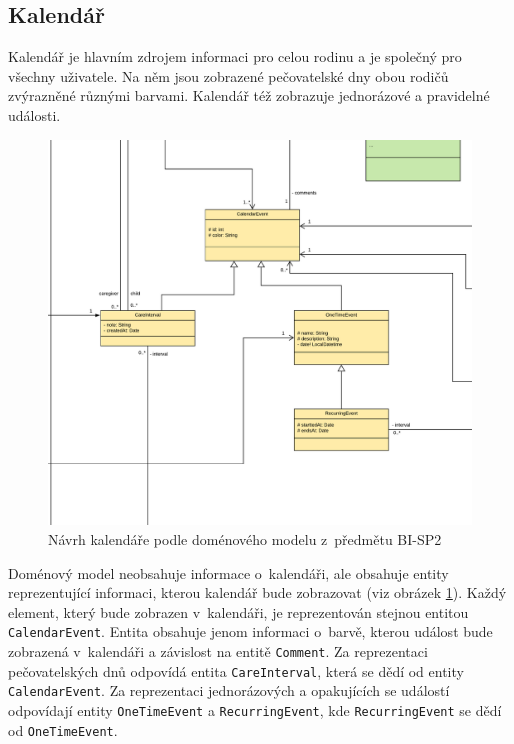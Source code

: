     \subsection{Kalendář}    
        Kalendář je hlavním zdrojem informaci pro celou rodinu a je společný pro všechny uživatele. Na něm jsou zobrazené pečovatelské dny obou rodičů zvýrazněné různými barvami. Kalendář též zobrazuje jednorázové a pravidelné události.
        
        \begin{figure}\centering
	        \includegraphics[width=1.0\textwidth]{pdfs/CalendarInfo1}
	        \caption[Současný návrh kalendáře]{Návrh kalendáře podle doménového modelu z~předmětu BI-SP2}\label{image:calendar-info}
        \end{figure}
        Doménový model neobsahuje informace o~kalendáři, ale obsahuje entity reprezentující informaci, kterou kalendář bude zobrazovat (viz obrázek \ref{image:calendar-info}). Každý element, který bude zobrazen v~kalendáři, je reprezentován stejnou entitou \verb|CalendarEvent|. Entita obsahuje jenom informaci o~barvě, kterou událost bude zobrazená v~kalendáři a závislost na entitě \verb|Comment|. Za reprezentaci pečovatelských dnů odpovídá entita \verb|CareInterval|, která se dědí od entity \verb|CalendarEvent|. Za reprezentaci jednorázových a opakujících se událostí odpovídají entity \verb|OneTimeEvent| a \verb|RecurringEvent|, kde \verb|RecurringEvent| se dědí od \verb|OneTimeEvent|.
        
